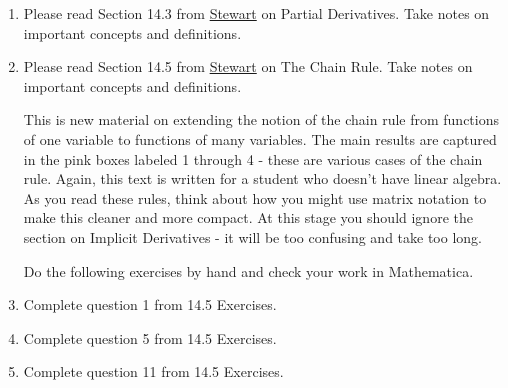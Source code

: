 \documentclass[M3_Night2_Solutions]{subfiles}
\begin{document}
\begin{enumerate}[resume=exercises, label=\textbf{Exercise} (\arabic*)]
\item Please read Section 14.3 from \href{https://drive.google.com/file/d/1PMW_Smnfv3_aJ85pzC-yCx52dAQNWZNT/view?usp=sharing}{Stewart} on Partial Derivatives. Take notes on important concepts and definitions. 

\item Please read Section 14.5 from \href{https://drive.google.com/file/d/1PMW_Smnfv3_aJ85pzC-yCx52dAQNWZNT/view?usp=sharing}{Stewart} on The Chain Rule. Take notes on important concepts and definitions.

This is new material on extending the notion of the chain rule from functions of one variable to functions of many variables. The main results are captured in the pink boxes labeled 1 through 4 - these are various cases of the chain rule. Again, this text is written for a student who doesn't have linear algebra. As you read these rules, think about how you might use matrix notation to make this cleaner and more compact. At this stage you should ignore the section on Implicit Derivatives - it will be too confusing and take too long. 

Do the following exercises by hand and check your work in Mathematica.

\item Complete question 1 from 14.5 Exercises.
\item Complete question 5 from 14.5 Exercises.
\item Complete question 11 from 14.5 Exercises.

\end{enumerate}
\end{document}
